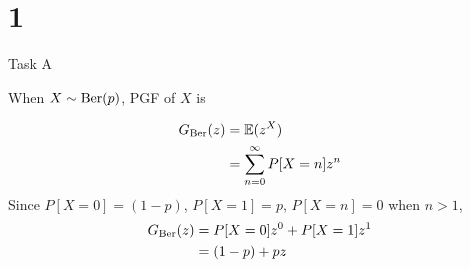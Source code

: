 \chapter{1}

\begin{task}{ Task A }

	When $X\sim\text{Ber}(p)$, PGF of $X$ is

	\begin{align}
		G_{\text{Ber}}(z) & = \mathbb{E}(z^X)                     \\
		          & = \sum_{n=0}^\infty P[X=n]z^n
	\end{align}
	Since $P[X=0]=(1-p)$, $P[X=1] = p$, $P[X=n]=0$ when $n>1$,
	\begin{align}
		G_{\text{Ber}}(z) & = P[X=0]z^0 + P[X=1]z^1 \\
		          & = (1-p) + pz
		\label{en:pgfber}
	\end{align}

\end{task}


